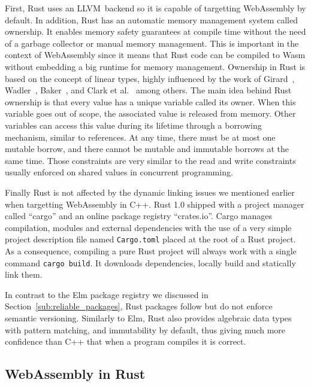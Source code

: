 First, Rust uses an LLVM backend so it is capable of targetting WebAssembly by default.
In addition, Rust has an automatic memory management system called ownership.
It enables memory safety guarantees at compile time
without the need of a garbage collector or manual memory management.
This is important in the context of WebAssembly since it means that Rust code
can be compiled to Wasm without embedding a big runtime for memory management.
Ownership in Rust is based on the concept of linear types,
highly influenced by the work of Girard~\cite{girard1987linear},
Wadler~\cite{wadler1991there}, Baker~\cite{baker1992lively},
and Clark et al.~\cite{clarke1998ownership} among others.
The main idea behind Rust ownership is that every value has
a unique variable called its owner.
When this variable goes out of scope, the associated value is released from memory.
Other variables can access this value during its lifetime
through a borrowing mechanism, similar to references.
At any time, there must be at most one mutable borrow,
and there cannot be mutable and immutable borrows at the same time.
Those constraints are very similar to the read and write constraints
usually enforced on shared values in concurrent programming.

Finally Rust is not affected by the dynamic linking issues
we mentioned earlier when targetting WebAssembly in C++.
Rust 1.0 shipped with a project manager called ``cargo''
and an online package registry ``crates.io''.
Cargo manages compilation, modules and external dependencies
with the use of a very simple project description file named \verb|Cargo.toml|
placed at the root of a Rust project.
As a consequence, compiling a pure Rust project will always work
with a single command \verb|cargo build|.
It downloads dependencies, locally build and statically link them.

In contrast to the Elm package registry we discussed in Section~\ref{sub:reliable_packages},
Rust packages follow but do not enforce semantic versioning.
Similarly to Elm, Rust also provides algebraic data types with pattern matching,
and immutability by default, thus giving much more confidence than C++
that when a program compiles it is correct.

\subsection{WebAssembly in Rust}%
\label{sub:wasm_in_rust}

